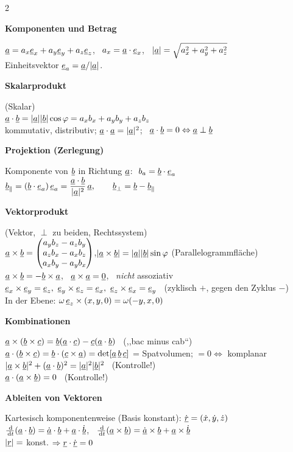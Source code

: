 \documentclass[10pt]{extarticle}
\newcommand{\hd}[1]{\par\medskip{\color{eth}\bfseries\large #1}\par\smallskip}
\newcommand{\sh}[1]{\par\smallskip\textbf{#1}\par}
\begin{document}
\begin{multicols}{2}
\hd{4 \ Vektoren}
\sh{Komponenten und Betrag}
$\underline{a}=a_x\underline{e}_{x}+a_y\underline{e}_{y}+a_z\underline{e}_{z}$, \ $a_x=\underline{a}\cdot\underline{e}_{x}$, \ $|\underline{a}|=\sqrt{a_x^2+a_y^2+a_z^2}$\\
Einheitsvektor $\underline{e}_a=\underline{a}/|\underline{a}|$.
\sh{Skalarprodukt} (Skalar)\\
$\underline{a}\cdot\underline{b}=|\underline{a}||\underline{b}|\cos\varphi=a_xb_x+a_yb_y+a_zb_z$\\
kommutativ, distributiv; $\underline{a}\cdot\underline{a}=|\underline{a}|^2$; \ $\underline{a}\cdot\underline{b}=0\Leftrightarrow\underline{a}\perp\underline{b}$
\sh{Projektion (Zerlegung)}
Komponente von $\underline{b}$ in Richtung $\underline{a}$: $\ b_a=\vv b\cdot\vv e_a$\\
$\underline{b}_\parallel=(\underline{b}\cdot\underline{e}_a)\,\underline{e}_a=\dfrac{\underline{a}\cdot\underline{b}}{|\underline{a}|^2}\,\underline{a},\qquad\underline{b}_\perp=\underline{b}-\underline{b}_\parallel$
\sh{Vektorprodukt} (Vektor, $\perp$ zu beiden, Rechtssystem)\\
$\underline{a}\times\underline{b}=\begin{pmatrix}a_yb_z-a_zb_y\\a_zb_x-a_xb_z\\a_xb_y-a_yb_x\end{pmatrix}$,\quad $|\underline{a}\times\underline{b}|=|\underline{a}||\underline{b}|\sin\varphi$ (Parallelogrammfläche)\\[2pt]
$\underline{a}\times\underline{b}=-\underline{b}\times\underline{a}$, \ $\underline{a}\times\underline{a}=\underline{0}$, \ \emph{nicht} assoziativ\\
$\e x\times\e y=\e z,\ \e y\times\e z=\e x,\ \e z\times\e x=\e y$ \ (zyklisch $+$, gegen den Zyklus $-$)\\
In der Ebene: $\omega\,\underline{e}_{z}\times(x,y,0)=\omega(-y,x,0)$
\sh{Kombinationen}
$\underline{a}\times(\underline{b}\times\underline{c})=\underline{b}(\underline{a}\cdot\underline{c})-\underline{c}(\underline{a}\cdot\underline{b})$ \ (,,bac minus cab``)\\
$\underline{a}\cdot(\underline{b}\times\underline{c})=\underline{b}\cdot(\underline{c}\times\underline{a})=\det[\underline{a}\,\underline{b}\,\underline{c}]$ = Spatvolumen; $=0\Leftrightarrow$ komplanar\\
$|\underline{a}\times\underline{b}|^2+(\underline{a}\cdot\underline{b})^2=|\underline{a}|^2|\underline{b}|^2$ \ (Kontrolle!)\\
$\underline{a}\cdot(\underline{a}\times\underline{b})=0$ \ (Kontrolle!)
\sh{Ableiten von Vektoren}
Kartesisch komponentenweise (Basis konstant): $\dot{\underline{r}}=(\dot x,\dot y,\dot z)$\\
$\frac{\,\mathrm{d}}{\,\mathrm{d} t}(\underline{a}\cdot\underline{b})=\dot{\underline{a}}\cdot\underline{b}+\underline{a}\cdot\dot{\underline{b}}$, \ $\frac{\,\mathrm{d}}{\,\mathrm{d} t}(\underline{a}\times\underline{b})=\dot{\underline{a}}\times\underline{b}+\underline{a}\times\dot{\underline{b}}$\\
$|\underline{r}|=$ konst. $\Rightarrow\underline{r}\cdot\dot{\underline{r}}=0$


\end{multicols}
\end{document}
